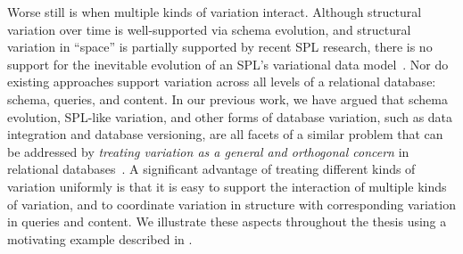 


Worse still is when multiple kinds of variation interact. Although structural
variation over time is well-supported via schema evolution, and structural
variation in ``space'' is partially supported by recent SPL research, there is
no support for the inevitable evolution of an SPL's variational data
model~\cite{dbSPLevolve}. Nor do existing approaches support variation across
all levels of a relational database: schema, queries, and content.
%
In our previous work, we have argued that schema evolution, SPL-like variation,
and other forms of database variation, such as data integration and database
versioning, are all facets of a similar problem that can be addressed by
\emph{treating variation as a general and orthogonal concern} in relational
databases~\cite{ATW17dbpl,ATW18poly,ALW21vamos}.
%
A significant advantage of treating different kinds of variation uniformly is
that it is easy to support the interaction of multiple kinds of variation, and
to coordinate variation in structure with corresponding variation in queries
and content. We illustrate these aspects throughout the thesis using a
motivating example described in .

